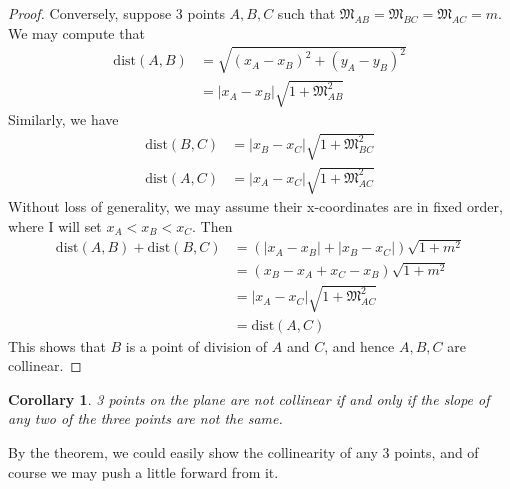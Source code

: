 \documentclass[12pt]{article}
\newtheorem*{corollary}{Corollary}
\begin{document}
\begin{proof}
        Conversely, suppose 3 points $A,B,C$ such that $\mathfrak{M}_{AB}=\mathfrak{M}_{BC}=\mathfrak{M}_{AC}=m$. We may compute that \begin{align*}
            \mathrm{dist}(A,B)&=\sqrt{(x_A-x_B)^2+(y_A-y_B)^2}\\
            &=|x_A-x_B|\sqrt{1+\mathfrak{M}_{AB}^2}
        \end{align*}
        Similarly, we have \begin{align*}
            \mathrm{dist}(B,C)&=|x_B-x_C|\sqrt{1+\mathfrak{M}_{BC}^2}\\
            \mathrm{dist}(A,C)&=|x_A-x_C|\sqrt{1+\mathfrak{M}_{AC}^2}
        \end{align*}
        Without loss of generality, we may assume their x-coordinates are in fixed order, where I will set $x_A<x_B<x_C$. Then \begin{align*}
            \mathrm{dist}(A,B)+\mathrm{dist}(B,C)&=(|x_A-x_B|+|x_B-x_C|)\sqrt{1+m^2}\\
            &=(x_B-x_A+x_C-x_B)\sqrt{1+m^2}\\
            &=|x_A-x_C|\sqrt{1+\mathfrak{M}_{AC}^2}\\
            &=\mathrm{dist}(A,C)
        \end{align*}
        This shows that $B$ is a point of division of $A$ and $C$, and hence $A,B,C$ are collinear.
    \end{proof}

    \begin{corollary}
        3 points on the plane are not collinear if and only if the slope of any two of the three points are not the same.
    \end{corollary}

    By the theorem, we could easily show the collinearity of any 3 points, and of course we may push a little forward from it.
    
\end{document}
